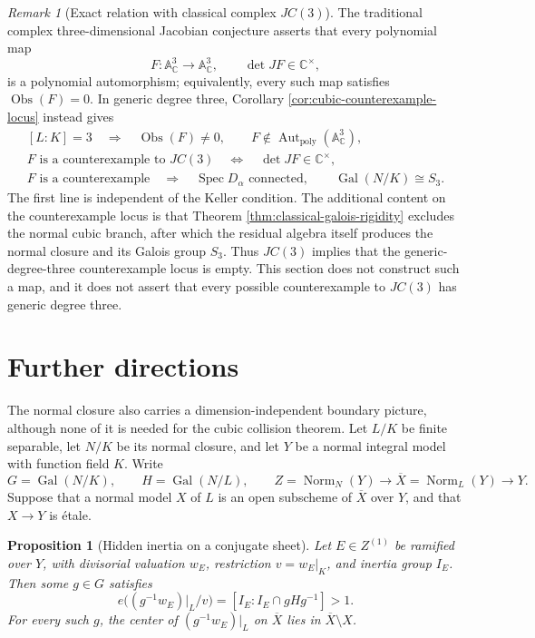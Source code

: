 \documentclass[11pt]{article}
\newtheorem{proposition}[theorem]{Proposition}
\theoremstyle{remark}
\newtheorem*{remark}{Remark}
\theoremstyle{definition}
\DeclareMathOperator{\Spec}{Spec}
\DeclareMathOperator{\Gal}{Gal}
\DeclareMathOperator{\Aut}{Aut}
\DeclareMathOperator{\Norm}{Norm}
\newcommand{\A}{\mathbb A}
\newcommand{\C}{\mathbb C}
\newcommand{\Obs}{\operatorname{Obs}}
\begin{document}
\begin{remark}[Exact relation with classical complex \(JC(3)\)]
\label{rem:exact-relation-jc3}
The traditional complex three-dimensional Jacobian conjecture asserts that
every polynomial map
\[
  F\colon\A^3_{\C}\longrightarrow\A^3_{\C},
  \qquad
  \det JF\in\C^\times,
\]
is a polynomial automorphism; equivalently, every such map satisfies
\(\Obs(F)=0\).  In generic degree three, Corollary
\ref{cor:cubic-counterexample-locus} instead gives
\[
  \begin{gathered}
    [L:K]=3
    \quad\Longrightarrow\quad
    \Obs(F)\neq0,\qquad
    F\notin\Aut_{\mathrm{poly}}(\A^3_{\C}),\\
    F\text{ is a counterexample to }JC(3)
    \quad\Longleftrightarrow\quad
    \det JF\in\C^\times,\\
    F\text{ is a counterexample}
    \quad\Longrightarrow\quad
    \Spec D_\alpha\text{ connected},\qquad
    \Gal(N/K)\cong S_3.
  \end{gathered}
\]
The first line is independent of the Keller condition.  The additional
content on the counterexample locus is that Theorem
\ref{thm:classical-galois-rigidity} excludes the normal cubic branch,
after which the residual algebra itself produces the normal closure and
its Galois group \(S_3\).  Thus \(JC(3)\) implies that the
generic-degree-three counterexample locus is empty.
This section does not construct such a map, and it does not assert that
every possible counterexample to \(JC(3)\) has generic degree three.
\end{remark}

\section{Further directions}
\label{sec:further-directions}

The normal closure also carries a dimension-independent boundary picture,
although none of it is needed for the cubic collision theorem.  Let
\(L/K\) be finite separable, let \(N/K\) be its normal closure, and let
\(Y\) be a normal integral model with function field \(K\).  Write
\[
  G=\Gal(N/K),\qquad H=\Gal(N/L),\qquad
  Z=\Norm_N(Y)\longrightarrow \overline X=\Norm_L(Y)\longrightarrow Y.
\]
Suppose that a normal model \(X\) of \(L\) is an open subscheme of
\(\overline X\) over \(Y\), and that \(X\to Y\) is \'etale.

\begin{proposition}[Hidden inertia on a conjugate sheet]
\label{prop:generic-hidden-inertia}
Let \(E\in Z^{(1)}\) be ramified over \(Y\), with divisorial valuation
\(w_E\), restriction \(v=w_E|_K\), and inertia group \(I_E\).  Then some
\(g\in G\) satisfies
\[
  e\bigl((g^{-1}w_E)|_L/v\bigr)
  =[I_E:I_E\cap gHg^{-1}]>1.
\]
For every such \(g\), the center of \((g^{-1}w_E)|_L\) on
\(\overline X\) lies in \(\overline X\setminus X\).
\end{proposition}
\end{document}
